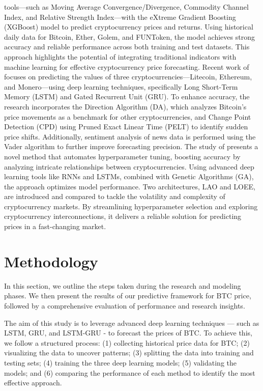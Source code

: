 \documentclass[]{interact}
\theoremstyle{plain}%
\theoremstyle{definition}
\theoremstyle{remark}
\begin{document}
tools---such as Moving Average Convergence/Divergence, Commodity Channel
Index, and Relative Strength Index---with the eXtreme Gradient Boosting
(XGBoost) model to predict cryptocurrency prices and returns. Using
historical daily data for Bitcoin, Ether, Golem, and FUNToken, the model
achieves strong accuracy and reliable performance across both training
and test datasets. This approach highlights the potential of integrating
traditional indicators with machine learning for effective
cryptocurrency price forecasting. Recent work of \citep{shirwaikar2025}
focuses on predicting the values of three cryptocurrencies---Litecoin,
Ethereum, and Monero---using deep learning techniques, specifically Long
Short-Term Memory (LSTM) and Gated Recurrent Unit (GRU). To enhance
accuracy, the research incorporates the Direction Algorithm (DA), which
analyzes Bitcoin's price movements as a benchmark for other
cryptocurrencies, and Change Point Detection (CPD) using Pruned Exact
Linear Time (PELT) to identify sudden price shifts. Additionally,
sentiment analysis of news data is performed using the Vader algorithm
to further improve forecasting precision. The study of
\citep{hafidi2025} presents a novel method that automates hyperparameter
tuning, boosting accuracy by analyzing intricate relationships between
cryptocurrencies. Using advanced deep learning tools like RNNs and
LSTMs, combined with Genetic Algorithms (GA), the approach optimizes
model performance. Two architectures, LAO and LOEE, are introduced and
compared to tackle the volatility and complexity of cryptocurrency
markets. By streamlining hyperparameter selection and exploring
cryptocurrency interconnections, it delivers a reliable solution for
predicting prices in a fast-changing market.

\section{Methodology}\label{methodology}

In this section, we outline the steps taken during the research and
modeling phases. We then present the results of our predictive framework
for BTC price, followed by a comprehensive evaluation of performance and
research insights.

The aim of this study is to leverage advanced deep learning techniques
--- such as LSTM, GRU, and LSTM-GRU - to forecast the prices of BTC. To
achieve this, we follow a structured process: (1) collecting historical
price data for BTC; (2) visualizing the data to uncover patterns; (3)
splitting the data into training and testing sets; (4) training the
three deep learning models; (5) validating the models; and (6) comparing
the performance of each method to identify the most effective approach.
\end{document}
